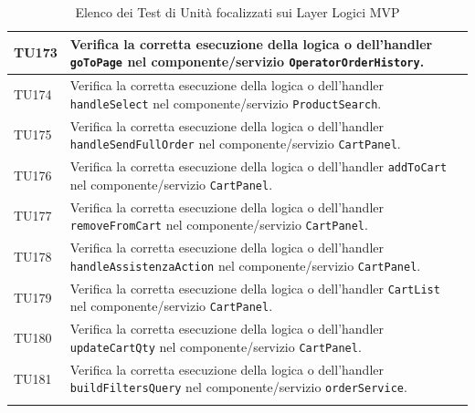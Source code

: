 \documentclass[a4paper,11pt,oneside]{scrartcl}
\begin{document}
\begin{longtable}{|p{1.9cm}|p{11.6cm}|c|}
TU173 & Verifica la corretta esecuzione della logica o dell'handler \texttt{goToPage} nel componente/servizio \texttt{OperatorOrderHistory}. & \\ \hline
TU174 & Verifica la corretta esecuzione della logica o dell'handler \texttt{handleSelect} nel componente/servizio \texttt{ProductSearch}. & \\ \hline
TU175 & Verifica la corretta esecuzione della logica o dell'handler \texttt{handleSendFullOrder} nel componente/servizio \texttt{CartPanel}. & \\ \hline
TU176 & Verifica la corretta esecuzione della logica o dell'handler \texttt{addToCart} nel componente/servizio \texttt{CartPanel}. & \\ \hline
TU177 & Verifica la corretta esecuzione della logica o dell'handler \texttt{removeFromCart} nel componente/servizio \texttt{CartPanel}. & \\ \hline
TU178 & Verifica la corretta esecuzione della logica o dell'handler \texttt{handleAssistenzaAction} nel componente/servizio \texttt{CartPanel}. & \\ \hline
TU179 & Verifica la corretta esecuzione della logica o dell'handler \texttt{CartList} nel componente/servizio \texttt{CartPanel}. & \\ \hline
TU180 & Verifica la corretta esecuzione della logica o dell'handler \texttt{updateCartQty} nel componente/servizio \texttt{CartPanel}. & \\ \hline
TU181 & Verifica la corretta esecuzione della logica o dell'handler \texttt{buildFiltersQuery} nel componente/servizio \texttt{orderService}. & \\ \hline
\caption{Elenco dei Test di Unità focalizzati sui Layer Logici MVP}
\end{longtable}
\end{document}

